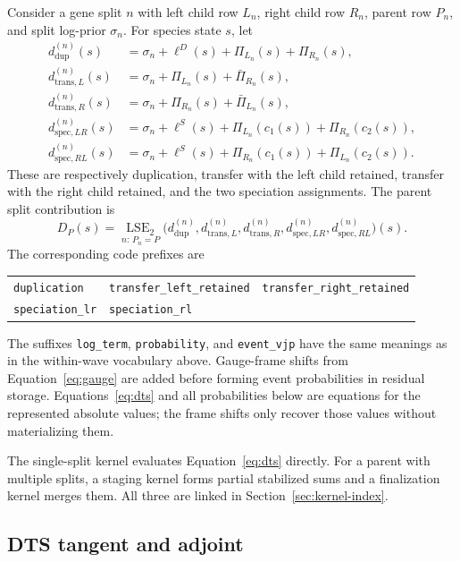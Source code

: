 \documentclass[11pt]{article}
\begin{document}
Consider a gene split $n$ with left child row $L_n$, right child row $R_n$,
parent row $P_n$, and split log-prior $\sigma_n$.  For species state $s$, let
\begin{align}
  d_{\mathrm{dup}}^{(n)}(s)&=\sigma_n+\ell^D(s)+\Pi_{L_n}(s)+\Pi_{R_n}(s), \\
  d_{\mathrm{trans},L}^{(n)}(s)&=\sigma_n+\Pi_{L_n}(s)+\bar\Pi_{R_n}(s), \\
  d_{\mathrm{trans},R}^{(n)}(s)&=\sigma_n+\Pi_{R_n}(s)+\bar\Pi_{L_n}(s), \\
  d_{\mathrm{spec},LR}^{(n)}(s)&=\sigma_n+\ell^S(s)
    +\Pi_{L_n}(c_1(s))+\Pi_{R_n}(c_2(s)), \\
  d_{\mathrm{spec},RL}^{(n)}(s)&=\sigma_n+\ell^S(s)
    +\Pi_{R_n}(c_1(s))+\Pi_{L_n}(c_2(s)).
\end{align}
These are respectively duplication, transfer with the left child retained,
transfer with the right child retained, and the two speciation assignments.
The parent split contribution is
\begin{equation}
  D_P(s)=\underset{n:\,P_n=P}{\operatorname{LSE}_2}
  \bigl(
    d_{\mathrm{dup}}^{(n)},d_{\mathrm{trans},L}^{(n)},
    d_{\mathrm{trans},R}^{(n)},d_{\mathrm{spec},LR}^{(n)},
    d_{\mathrm{spec},RL}^{(n)}
  \bigr)(s).
  \label{eq:dts}
\end{equation}
The corresponding code prefixes are
\begin{center}
\begin{tabular}{lll}
\texttt{duplication} & \texttt{transfer\_left\_retained} & \texttt{transfer\_right\_retained} \\
\texttt{speciation\_lr} & \texttt{speciation\_rl} &
\end{tabular}
\end{center}
The suffixes \texttt{log\_term},
\texttt{probability}, and \texttt{event\_vjp} have the same meanings as in
the within-wave vocabulary above.
Gauge-frame shifts from Equation~\eqref{eq:gauge} are added before forming
event probabilities in residual storage.  Equations~\eqref{eq:dts} and all
probabilities below are equations for the represented absolute values; the
frame shifts only recover those values without materializing them.

The single-split kernel evaluates Equation~\eqref{eq:dts} directly.  For a
parent with multiple splits, a staging kernel forms partial stabilized sums
and a finalization kernel merges them.  All three are linked in
Section~\ref{sec:kernel-index}.

\subsection{DTS tangent and adjoint}
\end{document}
